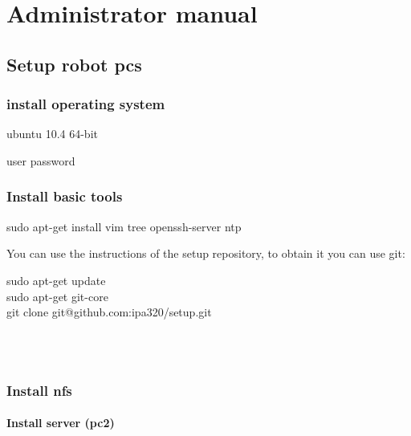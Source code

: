
\chapter{Administrator manual}   
\section{Setup robot pcs}

\subsection{install operating system}
ubuntu 10.4 64-bit

user password


\subsection{Install basic tools}
  \colorbox{light-gray}{
         \begin{minipage}{1.0\textwidth} 
	sudo apt-get install vim tree openssh-server ntp
         \end{minipage} }


You can use the instructions of the setup repository, to obtain it you can use git: 
\\
 \colorbox{light-gray} {
         \begin{minipage}{1.0\textwidth} 
  	sudo apt-get update \\ 
	sudo apt-get git-core \\
	git clone git@github.com:ipa320/setup.git
         \end{minipage} 
         }  \\
\\
\subsection{Install nfs}

\subsubsection{Install server (pc2)}

